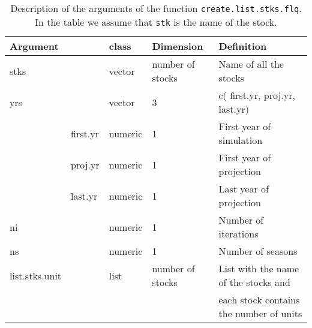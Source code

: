 \begin{landscape}
\begin{table}[!ht]
\begin{footnotesize}
  \end{footnotesize}

\end{table}



\begin{table}[!ht]

  \centering
  \begin{footnotesize}
    
    \caption{Description of the arguments of the function \texttt{create.list.stks.flq}. 
      In the table we assume that \texttt{stk} is the name of the stock.}
    
    \label{tb:A4.table8}
    
    \begin{tabular}{lllll} %
      \hline 
      Argument & & class & Dimension & Definition\\
      \hline
      stks & & vector & number of stocks &	Name of all the stocks\\
      yrs & & vector & 3 &	c( first.yr, proj.yr, last.yr)\\
        & first.yr & numeric & 1 & First year of simulation\\
        & proj.yr  & numeric & 1 & First year of projection\\
        & last.yr  & numeric & 1 & Last year of projection\\
      ni & & numeric &	1 &	Number of iterations\\
      ns & & numeric &	1 &	Number of seasons\\
      list.stks.unit & & list & number of stocks &	List with the name of the stocks and\\
       & & & & each stock contains the number of units\\
      \hline
    \end{tabular}
      
  \end{footnotesize}

\end{table}



\begin{table}[!ht]

  \centering
  \begin{footnotesize}
    

\end{footnotesize}
\end{table}
\end{landscape}
